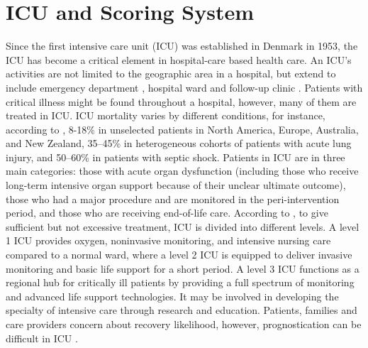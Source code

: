 \documentclass[12pt,a4paper,english
]{tunithesis}
\begin{document}
\section{ICU and Scoring System}
Since the first intensive care unit (ICU) was established in Denmark in 1953, the ICU has become a critical element in hospital-care based health care. An ICU's activities are not limited to the geographic area in a hospital, but extend to include emergency department , hospital ward and follow-up clinic \parencite{Marshell2017}. Patients with critical illness might be found throughout a hospital, however, many of them are treated in ICU. ICU mortality varies by different conditions, for instance, according to \textcite{Adhikari2010}, 8-18\% in unselected patients in North America, Europe, Australia, and New Zealand, 35–45\% in heterogeneous cohorts of patients with acute lung injury, and 50–60\% in patients with septic shock. Patients in ICU are in three main categories: those with acute organ dysfunction (including those who receive long-term intensive organ support because of their unclear ultimate outcome), those who had a major procedure and are monitored in the peri-intervention period, and those who are receiving end-of-life care. According to \textcite{Marshell2017}, to give sufficient but not excessive treatment, ICU is divided into different levels. A level 1 ICU provides oxygen, noninvasive monitoring, and intensive nursing care compared to a normal ward, where a level 2 ICU is equipped to deliver invasive monitoring and basic life support for a short period. A level 3 ICU functions as a regional hub for critically ill patients by providing a full spectrum of monitoring and advanced life support technologies. It may be involved in developing the specialty of intensive care through research and education. Patients, families and care providers concern about recovery likelihood, however, prognostication can be difficult in ICU \parencite{Tiffany21}.
\end{document}
